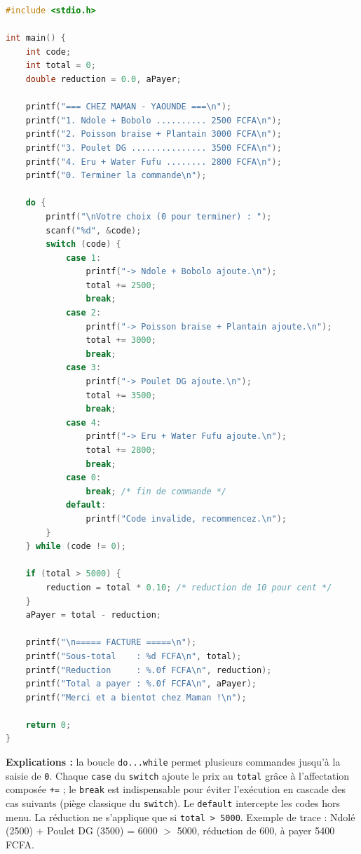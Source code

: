\documentclass[11pt]{article}
\begin{document}
\begin{corrige}
\begin{lstlisting}[language=C]
#include <stdio.h>

int main() {
    int code;
    int total = 0;
    double reduction = 0.0, aPayer;

    printf("=== CHEZ MAMAN - YAOUNDE ===\n");
    printf("1. Ndole + Bobolo .......... 2500 FCFA\n");
    printf("2. Poisson braise + Plantain 3000 FCFA\n");
    printf("3. Poulet DG ............... 3500 FCFA\n");
    printf("4. Eru + Water Fufu ........ 2800 FCFA\n");
    printf("0. Terminer la commande\n");

    do {
        printf("\nVotre choix (0 pour terminer) : ");
        scanf("%d", &code);
        switch (code) {
            case 1:
                printf("-> Ndole + Bobolo ajoute.\n");
                total += 2500;
                break;
            case 2:
                printf("-> Poisson braise + Plantain ajoute.\n");
                total += 3000;
                break;
            case 3:
                printf("-> Poulet DG ajoute.\n");
                total += 3500;
                break;
            case 4:
                printf("-> Eru + Water Fufu ajoute.\n");
                total += 2800;
                break;
            case 0:
                break; /* fin de commande */
            default:
                printf("Code invalide, recommencez.\n");
        }
    } while (code != 0);

    if (total > 5000) {
        reduction = total * 0.10; /* reduction de 10 pour cent */
    }
    aPayer = total - reduction;

    printf("\n===== FACTURE =====\n");
    printf("Sous-total    : %d FCFA\n", total);
    printf("Reduction     : %.0f FCFA\n", reduction);
    printf("Total a payer : %.0f FCFA\n", aPayer);
    printf("Merci et a bientot chez Maman !\n");

    return 0;
}
\end{lstlisting}
\textbf{Explications :} la boucle \texttt{do...while} permet plusieurs commandes jusqu'à la saisie de \texttt{0}. Chaque \texttt{case} du \texttt{switch} ajoute le prix au \texttt{total} grâce à l'affectation composée \texttt{+=} ; le \texttt{break} est indispensable pour éviter l'exécution en cascade des cas suivants (piège classique du \texttt{switch}). Le \texttt{default} intercepte les codes hors menu. La réduction ne s'applique que si \texttt{total > 5000}. Exemple de trace : Ndolé (2500) + Poulet DG (3500) = 6000 $>$ 5000, réduction de 600, à payer 5400 FCFA.
\end{corrige}
\end{document}
